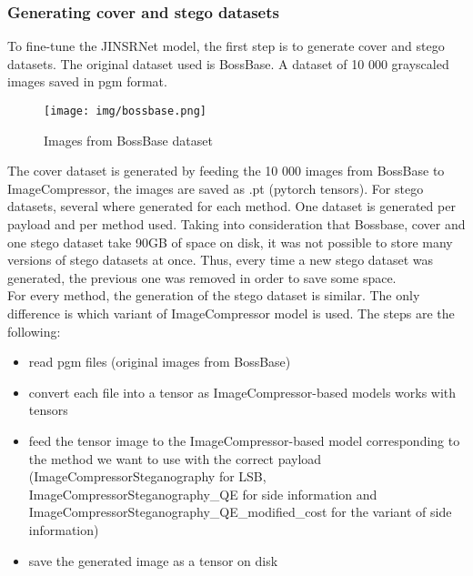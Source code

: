 \documentclass[12pt]{article}
\begin{document}
\subsubsection{Generating cover and stego datasets}
To fine-tune the JINSRNet model, the first step is to generate cover and stego datasets. The original dataset used is BossBase. A dataset of 10 000 grayscaled images saved in pgm format. 

\begin{figure}[H]
    \texttt{[image: img/bossbase.png]}
    \caption[BossBase]{Images from BossBase dataset}
    \label{fig:bossbase}
\end{figure}

The cover dataset is generated by feeding the 10 000 images from BossBase to ImageCompressor, the images are saved as .pt (pytorch tensors). For stego datasets, several where generated for each method. One dataset is generated per payload and per method used. Taking into consideration that Bossbase, cover and one stego dataset take 90GB of space on disk, it was not possible to store many versions of stego datasets at once. Thus, every time a new stego dataset was generated, the previous one was removed in order to save some space.\\
For every method, the generation of the stego dataset is similar. The only difference is which variant of ImageCompressor model is used. The steps are the following:
\begin{itemize}
    \item read pgm files (original images from BossBase)
    \item convert each file into a tensor as ImageCompressor-based models works with tensors
    \item feed the tensor image to the ImageCompressor-based model corresponding to the method we want to use with the correct payload (ImageCompressorSteganography for LSB, ImageCompressorSteganography\_QE for side information and ImageCompressorSteganography\_QE\_modified\_cost for the variant of side information)
    \item save the generated image as a tensor on disk
\end{itemize}
\end{document}
